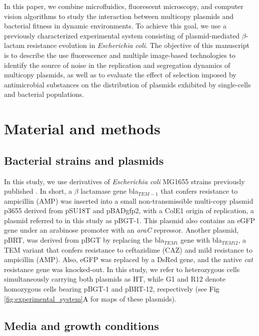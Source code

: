 \documentclass[fleqn,12pt]{wlscirep}
\newcommand{\fig}[1]{\textcolor{black}{#1}}
\begin{document}
In this paper, we combine microfluidics, fluorescent microscopy, and computer vision algorithms to study the interaction between multicopy plasmids and bacterial fitness in dynamic environments. To achieve this goal, we use a previously characterized experimental system consisting of plasmid-mediated $\beta$-lactam resistance evolution in {\em Escherichia coli}\cite{Rodriguez2018}. The objective of this manuscript is to describe the use fluorescence and multiple image-based technologies to identify the source of noise in the replication and segregation dynamics of multicopy plasmids, as well as to evaluate the effect of selection imposed by antimicrobial substances on the distribution of plasmids exhibited by single-cells and bacterial populations.
 
\section{Material and methods}

\subsection{Bacterial strains and plasmids}

In this study, we use derivatives of \textit{Escherichia coli} MG1655 strains previously published \cite{san2016multicopy,Rodriguez2018}. In short, a $\beta$ lactamase gene bla$_{TEM-1}$ that confers resistance to ampicillin (AMP) was inserted into a small non-transmissible multi-copy plasmid p3655 derived from pSU18T and pBADgfp2, with a ColE1 origin of replication\cite{le2007construction}, a plasmid referred to in this study as pBGT-1.  This plasmid also contains an eGFP gene under an arabinose promoter with an {\em araC} repressor. Another plasmid, pBRT,  was derived from pBGT by replacing the bla$_{TEM1}$ gene with bla$_{TEM12}$, a TEM variant that confers resistance to ceftazidime (CAZ) and mild resistance to ampicillin (AMP). Also, eGFP was replaced by a DsRed gene, and the native {\em cat} resistance gene was knocked-out. In this study, we refer to heterozygous cells simultaneously carrying both plasmids as HT, while G1 and R12 denote homozygous cells bearing pBGT-1 and pBRT-12, respectively (see \fig{Fig \ref{fig:experimental_system}A} for maps of these plasmids).

\subsection{Media and growth conditions}
\end{document}
